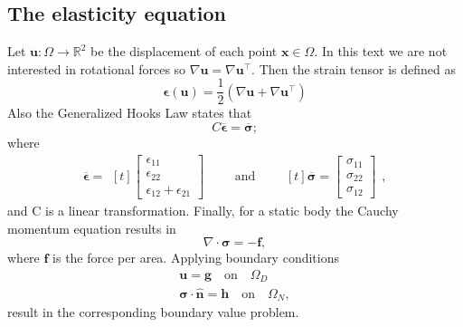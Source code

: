 \documentclass[11pt,a4paper,english]{elsarticle}%
\begin{document}
\subsection{The elasticity equation}
Let $\boldsymbol{u} : \Omega \rightarrow \mathbb{R}^2$ be the displacement of each point $\boldsymbol{x} \in \Omega$. In this text we are not interested in rotational forces so $\nabla \boldsymbol{u} = \nabla \boldsymbol{u}^\intercal$. Then the strain tensor is defined as 
\begin{equation} \label{eq-strain-tensor}
    \boldsymbol{\epsilon}(\boldsymbol{u}) = \frac{1}{2}(\nabla \boldsymbol{u} + \nabla \boldsymbol{u}^\intercal)
\end{equation}
Also the Generalized Hooks Law states that
\begin{equation}
    C \boldsymbol{\overline{\epsilon}}  = \boldsymbol{\overline{\sigma}};
    \label{hooks-law}
\end{equation}
where 
\begin{equation*}
    \boldsymbol{\overline{\epsilon}} =\begin{aligned}[t]
    \begin{bmatrix}
        \epsilon_{1 1} \\
        \epsilon_{2 2} \\
        \epsilon_{1 2} + \epsilon_{2 1}
    \end{bmatrix}
    \end{aligned}
    \qquad \text{and} \qquad
    \begin{aligned}[t]
        \boldsymbol{\overline{\sigma}} = \begin{bmatrix}
            \sigma_{1 1} \\
            \sigma_{2 2} \\
            \sigma_{1 2} 
        \end{bmatrix}
    \end{aligned},
\end{equation*}
and C is a linear transformation.
Finally, for a static body the Cauchy momentum equation results in 
\begin{equation} \label{eq-cauchy-momentum}
    \nabla \cdot \boldsymbol{\sigma} = -\boldsymbol{f},
\end{equation}
where $\boldsymbol{f}$ is the force per area. Applying boundary conditions 
\begin{align}
    \boldsymbol{u}  = \boldsymbol{g} \quad \text{on} \quad \Omega_D   \\
    \boldsymbol{\sigma} \cdot \boldsymbol{\hat{n}}  =  \boldsymbol{h} \quad \text{on} \quad \Omega_N,
    \label{elasticity-bc}
\end{align}
result in the corresponding boundary value problem. 
\end{document}
